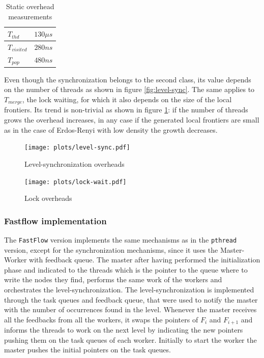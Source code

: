 \begin{table}[!htb]
    \begin{center}
        \begin{tabular}{|| l | c ||}
            \hline
             $T_{thd}$ & $130 \mu s$  \\ \hline
             $T_{visited}$ & $280ns$ \\ \hline
             $T_{pop}$ & $480ns$ \\ \hline
            \hline
        \end{tabular}
    \end{center}
    

    \label{tab:static-overhead-results}
    \caption{Static overhead measurements}
\end{table}

Even though the synchronization belongs to the second class, its value depends on the number of threads as shown in figure \ref{fig:level-sync}. The same applies to $T_{merge}$, the lock waiting, for which it also depends on the size of the local frontiers. Its trend is non-trivial as shown in figure \ref{fig:lock}: if the number of threads grows the overhead increases, in any case if the generated local frontiers are small as in the case of Erdos-Renyi with low density the growth decreases.

\begin{figure}[!htb]
    \centering
    \begin{minipage}{0.48\textwidth}
        \texttt{[image: plots/level-sync.pdf]}
        \caption{Level-synchronization overheads}
        \label{fig:level-sync}
    \end{minipage}
    \begin{minipage}{0.48\textwidth}
        \texttt{[image: plots/lock-wait.pdf]}
        \caption{Lock overheads}
        \label{fig:lock}
    \end{minipage}
\end{figure}

\subsubsection{Fastflow implementation}
The \texttt{FastFlow} version implements the same mechanisms as in the \texttt{pthread} version, except for the synchronization mechanisms, since it uses the Master-Worker with feedback queue. The master after having performed the initialization phase and indicated to the threads which is the pointer to the queue where to write the nodes they find, performs the same work of the workers and orchestrates the level-synchronization. The level-synchronization is implemented through the task queues and feedback queue, that were used to notify the master with the number of occurrences found in the level. Whenever the master receives all the feedbacks from all the workers, it swaps the pointers of $F_i$ and $F_{i+1}$ and informs the threads to work on the next level by indicating the new pointers pushing them on the task queues of each worker. Initially to start the worker the master pushes the initial pointers on the task queues.
